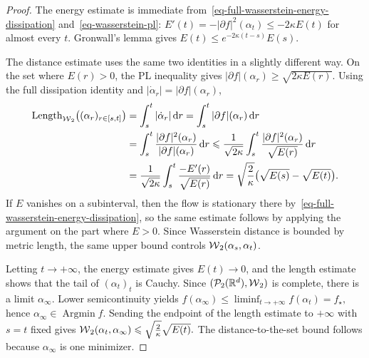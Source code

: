 \begin{proof}
The energy estimate is immediate from~\eqref{eq-full-wasserstein-energy-dissipation} and~\eqref{eq-wasserstein-pl}: \(E'(t) = -|\partial f|^2(\alpha_t) \leq -2\kappa E(t)\)
for almost every \(t\). Gronwall's lemma gives \(E(t)\leq e^{-2\kappa(t-s)}E(s)\).

The distance estimate uses the same two identities in a slightly different way. On the set where \(E(r)>0\), the PL inequality gives \(|\partial f|(\alpha_r)\geq \sqrt{2\kappa E(r)}.\)
Using the full dissipation identity and \(|\dot\alpha_r|=|\partial f|(\alpha_r)\),
\[
\begin{aligned}
\operatorname{Length}_{\operatorname{\mathcal{W}}_2}\bigl((\alpha_r)_{r\in[s,t]}\bigr)
&=
\int_s^t|\dot\alpha_r|\,\mathrm{d} r
=
\int_s^t|\partial f|(\alpha_r)\,\mathrm{d} r \\
&=
\int_s^t
\frac{|\partial f|^2(\alpha_r)}{|\partial f|(\alpha_r)}\,\mathrm{d} r
\leqslant
\frac{1}{\sqrt{2\kappa}}
\int_s^t
\frac{|\partial f|^2(\alpha_r)}{\sqrt{E(r)}}\,\mathrm{d} r \\
&=
\frac{1}{\sqrt{2\kappa}}
\int_s^t
\frac{-E'(r)}{\sqrt{E(r)}}\,\mathrm{d} r
=
\sqrt{\frac{2}{\kappa}}\bigl(\sqrt{E(s)}-\sqrt{E(t)}\bigr).
\end{aligned}
\]
If \(E\) vanishes on a subinterval, then the flow is stationary there by~\eqref{eq-full-wasserstein-energy-dissipation}, so the same estimate follows by applying the argument on the part where \(E>0\). Since Wasserstein distance is bounded by metric length, the same upper bound controls \(\operatorname{\mathcal{W}}_2(\alpha_s,\alpha_t)\).

Letting \(t\to+\infty\), the energy estimate gives \(E(t)\to0\), and the length estimate shows that the tail of \((\alpha_t)_t\) is Cauchy. Since \((\mathcal{P}_2(\mathbb{R}^d),\operatorname{\mathcal{W}}_2)\) is complete, there is a limit \(\alpha_\infty\). Lower semicontinuity yields
\(f(\alpha_\infty) \leq \liminf_{t\to+\infty}f(\alpha_t) = f_\star,\)
hence \(\alpha_\infty\in\operatorname{Argmin}f\). Sending the endpoint of the length estimate to \(+\infty\) with \(s=t\) fixed gives \(\operatorname{\mathcal{W}}_2(\alpha_t,\alpha_\infty) \leqslant \sqrt{\frac{2}{\kappa}}\sqrt{E(t)}.\)
The distance-to-the-set bound follows because \(\alpha_\infty\) is one minimizer.
\end{proof}
